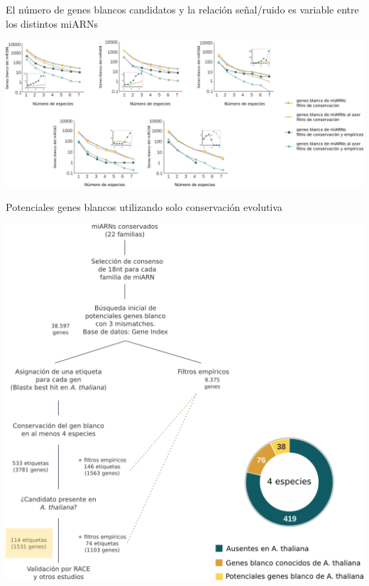 \documentclass{beamer}
\begin{document}
\begin{frame}{El número de genes blancos candidatos y la relación señal/ruido es variable entre los distintos miARNs}
	\begin{center}
		\includegraphics[width=1\textwidth]{img/NAR_fig2_bis.png}
	\end{center}
\end{frame}

\begin{frame}{Potenciales genes blancos utilizando solo conservación evolutiva}
	\begin{center}
		\includegraphics[width=.7\textwidth]{img/NAR_fig01y03.png}
	\end{center}
\end{frame}

\end{document}

